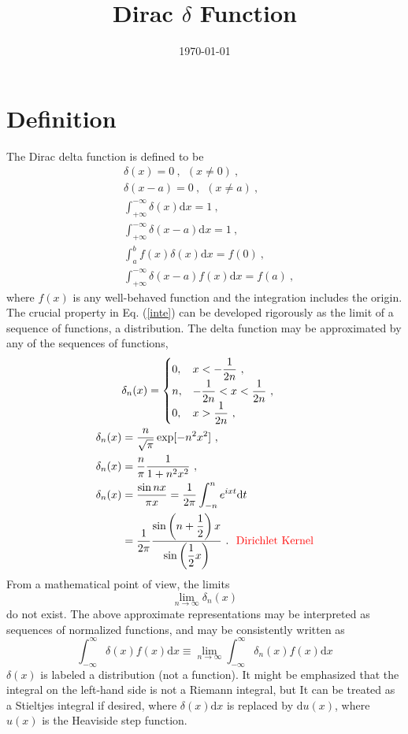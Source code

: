 \documentclass[12pt,a4paper]{article}
\title{Dirac $\delta$ Function}
\author{}
\date{\today}
\newcommand{\dif}{\mathrm{d}}
\begin{document}
\maketitle
\section{Definition}
The Dirac delta function is defined to be
\begin{align}
& \delta(x) = 0 ~, ~~ (x \neq 0) ~, \\
& \delta(x -a) = 0 ~, ~~ (x \neq a) ~, \\
& \int_{+\infty}^{-\infty} \delta(x) \dif x = 1 ~, \\
& \int_{+\infty}^{-\infty} \delta(x -a) \dif x = 1 ~, \\
\label{inte}
& \int_{a}^{b} f(x) \delta(x) \dif x = f(0) ~, \\
& \int_{+\infty}^{-\infty} \delta(x-a) f(x) \dif x = f(a)  ~, 
\end{align}
where $f(x)$ is any well-behaved function and the integration includes the origin. The crucial property in Eq. (\ref{inte}) can be developed rigorously as the limit of a sequence of functions, a distribution. The delta function may be approximated by any of the sequences of functions,
\begin{align}
& \delta_n(x) = \begin{cases}
0, &x < -\dfrac{1}{2n} ~, \\
n, &  -\dfrac{1}{2n} < x < \dfrac{1}{2n} ~, \\
0, & x >  \dfrac{1}{2n} ~,
\end{cases} \\
\delta_n(x) & = \dfrac{n}{\sqrt{\pi}} \exp [-n^2 x^2] ~, \\
\delta_n(x) & = \dfrac{n}{\pi} \dfrac{1}{1+n^2 x^2} ~, \\
\delta_n(x) & = \dfrac{\sin nx}{\pi x}  = \dfrac{1}{2\pi} \int_{-n}^n e^{ixt} \dif t \\
& = \dfrac{1}{2\pi} \dfrac{\sin \left( n +\dfrac{1}{2} \right)x}{\sin \left(\dfrac{1}{2} x \right)} ~. ~~\textcolor{red}{\text{Dirichlet Kernel}}
\end{align}
From a mathematical point of view, the limits
\begin{equation*}
\underset{n \rightarrow \infty}\lim \delta_n(x)
\end{equation*}
do not exist. The above approximate representations may be interpreted as sequences of normalized functions, and may be consistently written as
\begin{equation}
\int_{-\infty}^\infty  \delta(x) f(x) \dif x \equiv \underset{n \rightarrow \infty}\lim  \int_{-\infty}^\infty  \delta_n(x) f(x) \dif x
\end{equation}
$\delta(x)$ is labeled a distribution (not a function). It might be emphasized that the integral on the left-hand side is not a Riemann integral, but It can be treated as a Stieltjes integral if desired, where $\delta(x) \dif x$ is replaced by $\dif u(x)$, where $u(x)$ is the Heaviside step function.
\end{document}
